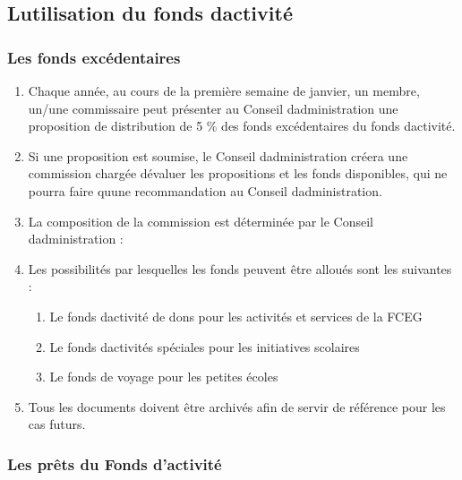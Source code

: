 \subsection{L\textquotesingle utilisation du fonds d\textquotesingle activité}
\label{l-utilisation-du-fonds-d-activite}

\subsubsection{Les fonds excédentaires}
\label{les-fonds-excedentaires}

\begin{enumerate}
 \item
  Chaque année, au cours de la première semaine de janvier, un membre, un/une commissaire peut présenter au Conseil d\textquotesingle administration une proposition de distribution de 5 \% des fonds excédentaires du fonds d\textquotesingle activité.
 \item
  Si une proposition est soumise, le Conseil d\textquotesingle administration créera une commission chargée d\textquotesingle évaluer les propositions et les fonds disponibles, qui ne pourra faire qu\textquotesingle une recommandation au Conseil d\textquotesingle administration.
 \item
  La composition de la commission est déterminée par le Conseil d\textquotesingle administration :
 \item
  Les possibilités par lesquelles les fonds peuvent être alloués sont les suivantes :

  \begin{enumerate}
   \item
    Le fonds d\textquotesingle activité de dons pour les activités et services de la FCEG
   \item
    Le fonds d\textquotesingle activités spéciales pour les initiatives scolaires
   \item
    Le fonds de voyage pour les petites écoles
  \end{enumerate}
 \item
  Tous les documents doivent être archivés afin de servir de référence pour les cas futurs.
\end{enumerate}

\subsubsection{Les prêts du Fonds d'activité}
\label{les-prets-du-fonds-d-activite}

